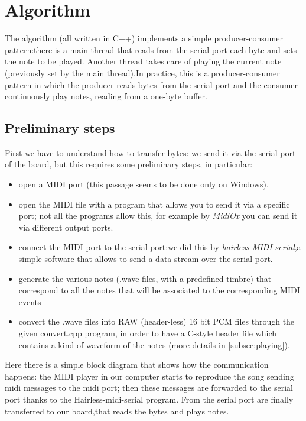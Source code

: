 \documentclass[12pt]{article}
\begin{document}
\section{Algorithm} \label{sec:algorithm}
The algorithm (all written in C++) implements a simple producer-consumer pattern:there is a main thread that reads from the serial port each byte and sets the note to be played. Another thread takes care of playing the current note (previously set by the main thread).In practice, this is a producer-consumer pattern in which the producer reads bytes from the serial port and the consumer continuously play notes, reading from a one-byte buffer.

\subsection{Preliminary steps}\label{subsec:pre_steps}
First we have to understand how to transfer bytes: we send it via the serial port of the board, but this requires some preliminary steps, in particular:
\begin{itemize}
	\item open a MIDI port (this passage seems to be done only on Windows).
	\item open the MIDI file with a program that allows you to send it via a specific port; not all the programs allow this, for example by \textit{MidiOx}  you can send it via different output ports.
	\item connect the MIDI port to the serial port:we did this by \textit{hairless-MIDI-serial},a simple software that allows to send a data stream over the serial port.
	\item generate the various notes (.wave files, with a predefined timbre) that correspond to all the notes that will be associated to the corresponding MIDI events 
	\item convert the .wave files into RAW (header-less) 16 bit PCM files through the given convert.cpp program, in order to have a C-style header file which contains a kind of waveform of the notes (more details in \ref{subsec:playing}).
\end{itemize}
Here there is a simple block diagram that shows how the communication happens: the MIDI player in our computer starts to reproduce the song sending midi messages to the midi port; then these messages are forwarded to the serial port thanks to the Hairless-midi-serial program. From the serial port are finally transferred to our board,that reads the bytes and plays notes.
\end{document}
